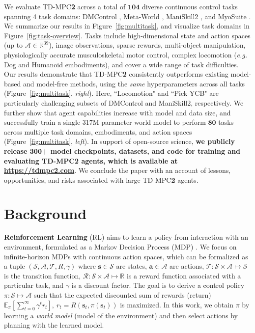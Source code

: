 \documentclass{article}
\begin{document}
We evaluate TD-MPC\textbf{2} across a total of $\mathbf{104}$ diverse continuous control tasks spanning 4 task domains: DMControl \citep{deepmindcontrolsuite2018}, Meta-World \citep{yu2019meta}, ManiSkill2 \citep{gu2023maniskill2}, and MyoSuite \citep{MyoSuite2022}. We summarize our results in Figure~\ref{fig:multitask}, and visualize task domains in Figure~\ref{fig:task-overview}. Tasks include high-dimensional state and action spaces (up to $\mathcal{A} \in \mathbb{R}^{39}$), image observations, sparse rewards, multi-object manipulation, physiologically accurate musculoskeletal motor control, complex locomotion (\emph{e.g.} Dog and Humanoid embodiments), and cover a wide range of task difficulties. Our results demonstrate that TD-MPC\textbf{2} consistently outperforms existing model-based and model-free methods, using the \emph{same} hyperparameters across all tasks (Figure~\ref{fig:multitask}, \emph{right}). Here, ``Locomotion" and ``Pick YCB" are particularly challenging subsets of DMControl and ManiSkill2, respectively. We further show that agent capabilities increase with model and data size, and successfully train a single $317$M parameter world model to perform $\mathbf{80}$ tasks across multiple task domains, embodiments, and action spaces (Figure~\ref{fig:multitask}, \emph{left}). In support of open-source science, \textbf{we publicly release $\mathbf{300}$+ model checkpoints, datasets, and code for training and evaluating TD-MPC\textbf{2} agents, which is available at \url{https://tdmpc2.com}}. We conclude the paper with an account of lessons, opportunities, and risks associated with large TD-MPC\textbf{2} agents.


\section{Background}
\label{sec:background}
\textbf{Reinforcement Learning} (RL) aims to learn a policy from interaction with an environment, formulated as a Markov Decision Process (MDP) \citep{Bellman1957MDP}. We focus on infinite-horizon MDPs with continuous action spaces, which can be formalized as a tuple $(\mathcal{S}, \mathcal{A}, \mathcal{T}, R, \gamma)$ where $\mathbf{s} \in \mathcal{S}$ are states, $\mathbf{a} \in \mathcal{A}$ are actions, $\mathcal{T \colon \mathcal{S} \times \mathcal{A} \mapsto \mathcal{S}}$ is the transition function, $\mathcal{R} \colon \mathcal{S} \times \mathcal{A} \mapsto \mathbb{R}$ is a reward function associated with a particular task, and $\gamma$ is a discount factor. The goal is to derive a control policy $\pi \colon \mathcal{S} \mapsto \mathcal{A}$ such that the expected discounted sum of rewards (return) $\mathbb{E}_{\pi}\left[ \sum_{t=0}^{\infty} \gamma^{t} r_{t} \right],~r_{t} = R(\mathbf{s}_{t}, \pi(\mathbf{s}_{t}))$ is maximized. In this work, we obtain $\pi$ by learning a \emph{world model} (model of the environment) and then select actions by planning with the learned model.
\end{document}
